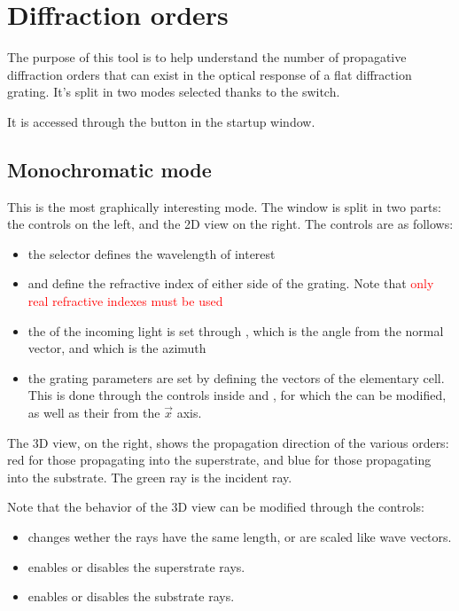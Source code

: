 \chapter{Diffraction orders}

The purpose of this tool is to help understand the number of propagative diffraction orders that can exist in the optical response of a flat diffraction grating. It's split in two modes selected thanks to the  switch.

It is accessed through the  button in the startup window.

\section{Monochromatic mode}

This is the most graphically interesting mode. The window is split in two parts: the controls on the left, and the 2D view on the right. The controls are as follows:
\begin{itemize}
	\item the  selector defines the wavelength of interest
	\item {} and  define the refractive index of either side of the grating. Note that \textcolor{red}{only real refractive indexes must be used}
	\item the  of the incoming light is set through , which is the angle from the normal vector, and  which is the azimuth
	\item the grating parameters are set by defining the vectors of the elementary cell. This is done through the controls inside  and , for which the  can be modified, as well as their  from the $\vec x$ axis.
\end{itemize}
The 3D view, on the right, shows the propagation direction of the various orders: red for those propagating into the superstrate, and blue for those propagating into the substrate. The green ray is the incident ray.

Note that the behavior of the 3D view can be modified through the  controls:
\begin{itemize}
	\item {} changes wether the rays have the same length, or are scaled like wave vectors.
	\item {} enables or disables the superstrate rays.
	\item {} enables or disables the substrate rays.
\end{itemize}

